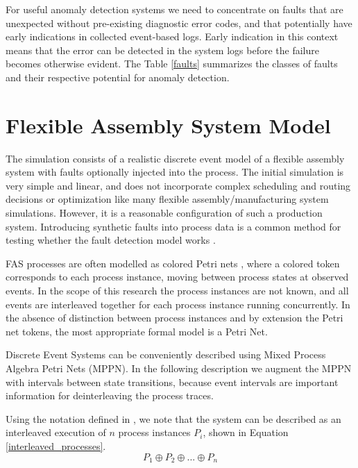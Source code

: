 \documentclass[procedia]{easychair}
\begin{document}
For useful anomaly detection systems we need to concentrate on faults that are unexpected without pre-existing diagnostic error codes, and that potentially have early indications
in collected event-based logs. Early indication in this context means that the error can be detected in the system logs before the failure becomes otherwise evident.
The Table \ref{faults} summarizes the classes of faults and their respective potential for anomaly detection.

\section{Flexible Assembly System Model}

The simulation consists of a realistic discrete event model of a flexible assembly system with faults optionally injected into the process.
The initial simulation is very simple and linear, and does not incorporate complex scheduling and routing decisions or optimization like many flexible assembly/manufacturing system simulations\cite{donath1988flexible}.
However, it is a reasonable configuration of such a production system. Introducing synthetic faults into process data is a common method for testing whether the fault detection model works \cite{able2016model}.

FAS processes are often modelled as colored Petri nets \cite{saitou2002robust}, where a colored token corresponds to each process instance, moving between process states at observed events.
In the scope of this research the process instances are not known, and all events are interleaved together for each process instance running concurrently. In the absence of distinction between process instances
and by extension the Petri net tokens, the most appropriate formal model is a Petri Net.

Discrete Event Systems can be conveniently
described using Mixed Process Algebra Petri Nets (MPPN)\cite{falkman2001modeling}. In the following description we augment the MPPN with intervals between state transitions,
because event intervals are important information for deinterleaving the process traces.

Using the notation defined in \cite{falkman2001combined}, we note that the system can be described as an interleaved execution of $ n $ process instances $ P_i $, shown in
Equation \ref{interleaved_processes}.
\begin{equation}
 P_1 \oplus P_2 \oplus ... \oplus P_n
 \label{interleaved_processes}
\end{equation}
\end{document}
